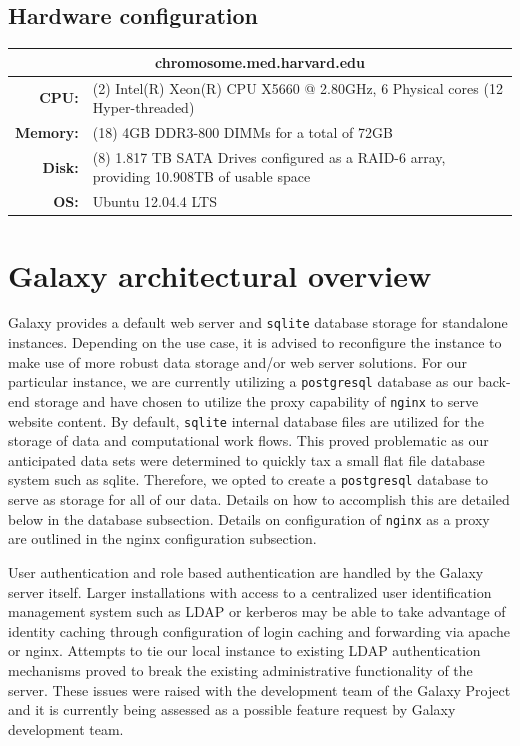 \documentclass[a4paper,10pt]{article}
\begin{document}
\subsection{Hardware configuration}
\renewcommand{\arraystretch}{1.5}
\begin{tabular}{|r|p{.8\linewidth}|}
\hline
\multicolumn{2}{|c|}{\textbf{chromosome.med.harvard.edu}}\\
\hline
\textbf{CPU:} & (2) Intel(R) Xeon(R) CPU  X5660  @ 2.80GHz, 6 Physical cores (12 Hyper-threaded)\\
\hline
\textbf{Memory:} & (18) 4GB DDR3-800 DIMMs for a total of 72GB\\
\hline
\textbf{Disk:} & (8) 1.817 TB SATA Drives configured as a RAID-6 array, providing 10.908TB of usable space\\
\hline
\textbf{OS:} & Ubuntu 12.04.4 LTS\\
\hline
\end{tabular}

\section{Galaxy architectural overview}
Galaxy provides a default web server and \texttt{\footnotesize{sqlite}} database storage for standalone instances.  Depending on the use case, it is advised to reconfigure the instance to make use of more robust data storage and/or web server solutions.  For our particular instance, we are currently utilizing a \texttt{\footnotesize{postgresql}} database as our back-end storage and have chosen to utilize the proxy capability of \texttt{\footnotesize{nginx}} to serve website content.  By default, \texttt{\footnotesize{sqlite}} internal database files are utilized for the storage of data and computational work flows.  This proved problematic as our anticipated data sets were determined to quickly tax a small flat file database system such as sqlite.  Therefore, we opted to create a \texttt{\footnotesize{postgresql}} database to serve as storage for all of our data.  Details on how to accomplish this are detailed below in the database subsection.  Details on configuration of \texttt{\footnotesize{nginx}} as a proxy are outlined in the nginx configuration subsection.

User authentication and role based authentication are handled by the Galaxy server itself.  Larger installations with access to a centralized user identification management system such as LDAP or kerberos may be able to take advantage of identity caching through configuration of login caching and forwarding via apache or nginx.  Attempts to tie our local instance to existing LDAP authentication mechanisms proved to break the existing administrative functionality of the server.  These issues were raised with the development team of the Galaxy Project and it is currently being assessed as a possible feature request by Galaxy development team.
\end{document}

